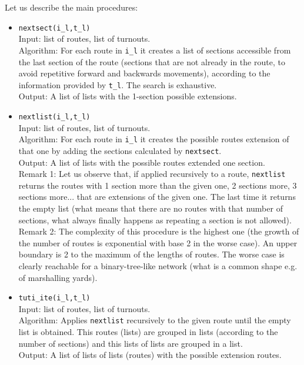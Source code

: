 \documentclass{article}
\begin{document}
Let us describe the main procedures:
\begin{itemize}
\item {\tt nextsect(i\_l,t\_l)}  \\
      Input: list of routes, list of turnouts. \\
      Algorithm: For each route in {\tt i\_l} it creates a list of sections       
                 accessible from the last section of the route (sections that are  
                 not already in the route, to avoid repetitive forward and backwards 
                 movements), according to the information
                 provided by {\tt t\_l}. The search is exhaustive. \\
      Output: A list of lists with the 1-section possible extensions.

\item {\tt nextlist(i\_l,t\_l)}  \\
      Input: list of routes, list of turnouts. \\
      Algorithm: For each route in {\tt i\_l} it creates the possible routes   
                 extension of
                 that one by adding the sections calculated by {\tt nextsect}.   \\
      Output: A list of lists with the possible routes extended one section.  \\
      Remark 1: Let us observe that, if applied recursively to a route, 
              {\tt nextlist} returns the 
              routes with 1 section more than the given one, 2 sections more, 3   
              sections more... 
              that are extensions of the given one. The last time it returns the empty 
              list (what means that there are no routes with that number of  
              sections, what always finally happens as repeating a section is not 
              allowed). \\
      Remark 2: The complexity of this procedure is the highest one (the growth of the 
                number of routes is exponential with base 2 in the worse case). An 
                upper boundary is 2 to the maximum of the lengths of routes.
                The worse case is clearly reachable for a binary-tree-like network (what   
                is a common shape e.g. of marshalling yards).

\item {\tt tuti\_ite(i\_l,t\_l)}  \\
      Input: list of routes, list of turnouts. \\
      Algorithm: Applies {\tt nextlist} recursively to the given route until the    
                 empty list is obtained. This routes (lists) are grouped in lists 
                 (according to the number of sections) and this lists of lists are 
                 grouped in a list.  \\
      Output: A list of lists of lists (routes) with the possible extension 
              routes.


\end{itemize}
\end{document}
